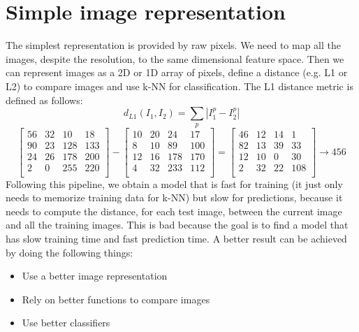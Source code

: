 \section{Simple image representation}
The simplest representation is provided by raw pixels. We need to map all the images, despite the resolution, to the same dimensional feature space. Then we can represent images as a 2D or 1D array of pixels, define a distance (e.g. L1 or L2) to compare images and use k-NN for classification.\newline\newline
The L1 distance metric is defined as follows:
\[d_{L1}(I_{1}, I_{2}) = \sum_{p}|I_{1}^{p} - I_{2}^{p}|\]
\[ \begin{bmatrix}
    56 & 32 & 10 & 18\\
    90 & 23 & 128 & 133\\
    24 & 26 & 178 & 200\\
    2 &  0  & 255 & 220\\
\end{bmatrix}
-
\begin{bmatrix}
    10 & 20 & 24 & 17\\
    8  & 10 & 89 & 100\\
    12 & 16 & 178& 170\\
    4  & 32 & 233& 112\\
\end{bmatrix}
=
\begin{bmatrix}
    46 & 12 & 14 & 1\\
    82 & 13 & 39 & 33\\
    12 & 10 & 0 & 30\\
    2 & 32 & 22 & 108\\
\end{bmatrix}
\rightarrow
456
\]
Following this pipeline, we obtain a model that is fast for training (it just only needs to memorize training data for k-NN) but slow for predictions, because it needs to compute the distance, for each test image, between the current image and all the training images. This is bad because the goal is to find a model that has slow training time and fast prediction time.\newline\newline
A better result can be achieved by doing the following things:
\begin{itemize}
    \item Use a better image representation
    \item Rely on better functions to compare images
    \item Use better classifiers
\end{itemize}
